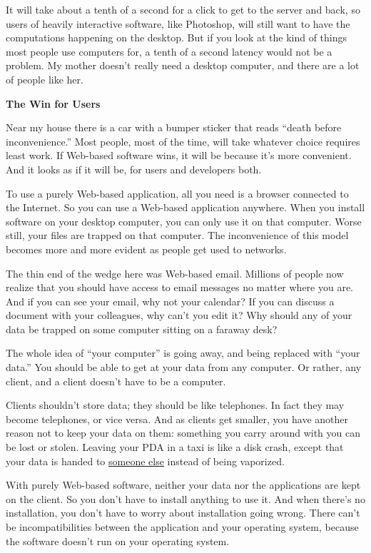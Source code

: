 It will take about a tenth of a second for a click to get to the server
and back, so users of heavily interactive software, like Photoshop, will
still want to have the computations happening on the desktop. But if you
look at the kind of things most people use computers for, a tenth of a
second latency would not be a problem. My mother doesn't really need a
desktop computer, and there are a lot of people like her.

\textbf{The Win for Users}

Near my house there is a car with a bumper sticker that reads ``death
before inconvenience.'' Most people, most of the time, will take
whatever choice requires least work. If Web-based software wins, it will
be because it's more convenient. And it looks as if it will be, for
users and developers both.

To use a purely Web-based application, all you need is a browser
connected to the Internet. So you can use a Web-based application
anywhere. When you install software on your desktop computer, you can
only use it on that computer. Worse still, your files are trapped on
that computer. The inconvenience of this model becomes more and more
evident as people get used to networks.

The thin end of the wedge here was Web-based email. Millions of people
now realize that you should have access to email messages no matter
where you are. And if you can see your email, why not your calendar? If
you can discuss a document with your colleagues, why can't you edit it?
Why should any of your data be trapped on some computer sitting on a
faraway desk?

The whole idea of ``your computer'' is going away, and being replaced
with ``your data.'' You should be able to get at your data from any
computer. Or rather, any client, and a client doesn't have to be a
computer.

Clients shouldn't store data; they should be like telephones. In fact
they may become telephones, or vice versa. And as clients get smaller,
you have another reason not to keep your data on them: something you
carry around with you can be lost or stolen. Leaving your PDA in a taxi
is like a disk crash, except that your data is handed to
\href{http://news.zdnet.co.uk/business/0,39020645,2077931,00.htm}{someone
else} instead of being vaporized.

With purely Web-based software, neither your data nor the applications
are kept on the client. So you don't have to install anything to use it.
And when there's no installation, you don't have to worry about
installation going wrong. There can't be incompatibilities between the
application and your operating system, because the software doesn't run
on your operating system.


